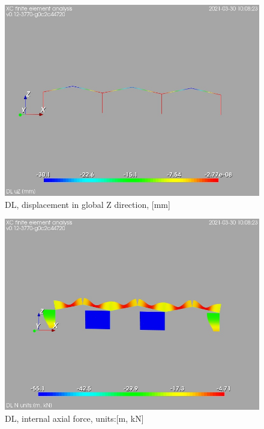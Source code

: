 \begin{figure}
\begin{center}
\includegraphics[width=\linewidth]{calc_results/sole_zeinali/text/graphics/resSimplLC/DLtotaluZ}
\caption{DL, displacement in global Z direction, [mm]}
\end{center}
\end{figure}
\begin{figure}
\begin{center}
\includegraphics[width=\linewidth]{calc_results/sole_zeinali/text/graphics/resSimplLC/DLallMemberSetN}
\caption{DL, internal axial force, units:[m, kN]}
\end{center}
\end{figure}

